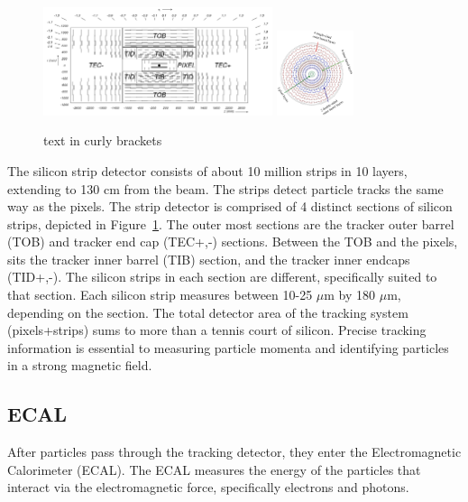 \begin{figure}[hbtp]
 \begin{center}
   \includegraphics[width=0.6\textwidth]{tracker_yz.pdf}
   \includegraphics[width=0.2\textwidth]{tracker_transverse_layers.pdf}
   \caption[text in square brackets]{text in curly brackets}
   \label{fig:cms_tracker}
 \end{center}
\end{figure}

The silicon strip detector consists of about 10 million strips in 10 layers, extending to 130 cm from the beam. The strips detect particle tracks the same way as the pixels.
The strip detector is comprised of 4 distinct sections of silicon strips, depicted in
Figure~\ref{fig:cms_tracker}. The outer most sections are the tracker outer barrel (TOB) and tracker end cap (TEC+,-) sections. Between the TOB and the pixels, sits the tracker
inner barrel (TIB) section, and the tracker inner endcaps (TID+,-). The silicon strips in each section are different, specifically suited to that section.
Each silicon strip measures between 10-25 $\mu$m by 180 $\mu$m, depending on the section. The total detector area of the tracking system (pixels+strips) sums to more than
a tennis court of silicon. Precise tracking information is essential to measuring particle momenta and identifying particles in a strong magnetic field.

\subsection{ECAL}

After particles pass through the tracking detector, they enter the Electromagnetic Calorimeter (ECAL). The ECAL measures the energy of the particles that interact via the
electromagnetic force, specifically electrons and photons.

